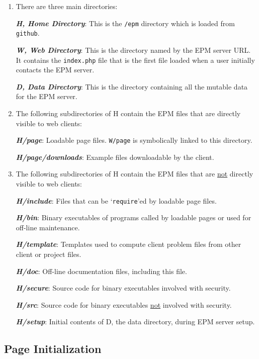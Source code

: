 \documentclass[12pt]{article}
\newcommand{\key}[1]{{\bf \em #1}}
\begin{document}
\begin{enumerate}
\item There are three main directories:\label{MAIN-DIRECTORIES}

      \key{H, Home Directory}:  This is the {\tt /epm}
      directory which is loaded from {\tt github}.

      \key{W, Web Directory}\label{W-DIRECTORY}:  This is the directory
      named by the EPM server URL.  It contains
      the {\tt index.php} file that is
      the first file loaded when a user initially
      contacts the EPM server.

      \key{D, Data Directory}:  This is the directory
      containing all the mutable data for the EPM server.

\item The following subdirectories of H contain the
      EPM files that are directly visible to web clients:

      \key{H/page}:  Loadable page files.  {\tt W/page} is
      symbolically linked to this directory.

      \key{H/page/downloads}:  Example files downloadable
      by the client.

\item The following subdirectories of H contain the
      EPM files that are \underline{not}
      directly visible to web clients:

      \key{H/include}:  Files that can be `{\tt require}'ed by
      loadable page files.

      \key{H/bin}:  Binary executables of programs called by
      loadable pages or used for off-line maintenance.

      \key{H/template}:  Templates used to compute client problem
      files from other client or project files.

      \key{H/doc}:  Off-line documentation files, including this file.

      \key{H/secure}:  Source code for binary executables involved with
      security.

      \key{H/src}:  Source code for binary executables \underline{not}
      involved with security.

      \key{H/setup}:  Initial contents of D, the data directory,
      during EPM server setup.

\end{enumerate}

\subsection{Page Initialization}
\end{document}
